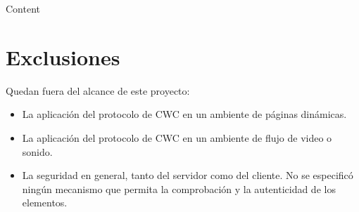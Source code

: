 Content


\section{Exclusiones}
Quedan fuera del alcance de este proyecto:

\begin{itemize}
\item La aplicación del protocolo de CWC en un ambiente de páginas dinámicas.
\item La aplicación del protocolo de CWC en un ambiente de flujo de video o sonido.
\item La seguridad en general, tanto del servidor como del cliente. No se especificó ningún mecanismo que permita la comprobación y la autenticidad de los elementos.
\end{itemize}


